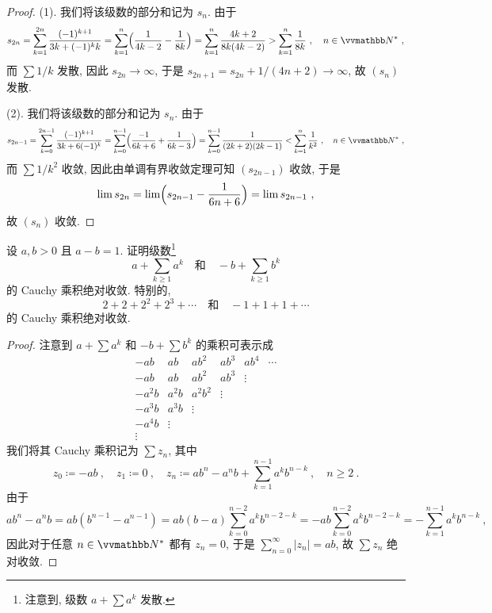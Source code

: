 \begin{proof}
    (1). 我们将该级数的部分和记为 \(s_n\). 由于
    \[
        s_{2 n} = \sum_{k = 1}^{2 n} \frac{(- 1)^{k + 1}}{3 k + (- 1)^k k} = \sum_{k = 1}^n \Bigl(\frac{1}{4 k - 2} - \frac{1}{8 k}\Bigr) = \sum_{k = 1}^n \frac{4 k + 2}{8 k (4 k - 2)} > \sum_{k = 1}^n \frac{1}{8 k}\ ,\quad n \in \N^\ast\ ,
    \]
    而 \(\sum 1 / k\) 发散, 因此 \(s_{2 n} \to \infty\), 于是 \(s_{2 n + 1} = s_{2 n} + 1 / (4 n + 2) \to \infty\), 故 \((s_n)\) 发散.

    (2). 我们将该级数的部分和记为 \(s_n\). 由于
    \[
        s_{2 n - 1} = \sum_{k = 0}^{2 n - 1} \frac{(- 1)^{k + 1}}{3 k + 6 (- 1)^k} = \sum_{k = 0}^{n - 1} \Bigl(\frac{- 1}{6 k + 6} + \frac{1}{6 k - 3}\Bigr) = \sum_{k = 0}^{n - 1} \frac{1}{(2 k + 2) (2 k - 1)} < \sum_{k = 1}^n \frac{1}{k^2}\ ,\quad n \in \N^\ast\ ,
    \]
    而 \(\sum 1 / k^2\) 收敛, 因此由单调有界收敛定理可知 \((s_{2 n - 1})\) 收敛, 于是
    \[
        \lim s_{2 n} = \lim \Bigl(s_{2 n - 1} - \frac{1}{6 n + 6}\Bigr) = \lim s_{2 n - 1}\ ,
    \]
    故 \((s_n)\) 收敛.
\end{proof}

\begin{exercise}
    设 \(a, b > 0\) 且 \(a - b = 1\). 证明级数\footnote{注意到, 级数 \(a + \sum a^k\) 发散.}
    \[
        a + \sum_{k \geq 1} a^k\quad \text{和}\quad - b + \sum_{k \geq 1} b^k
    \]
    的 Cauchy 乘积绝对收敛. 特别的,
    \[
        2 + 2 + 2^2 + 2^3 + \cdots\quad \text{和}\quad - 1 + 1 + 1 + \cdots
    \]
    的 Cauchy 乘积绝对收敛.
\end{exercise}

\begin{proof}
    注意到 \(a + \sum a^k\) 和 \(- b + \sum b^k\) 的乘积可表示成
    \[
        \begin{matrix}
            - a b   & a b   & a b^2   & a b^3 & a b^4 & \cdots \\
            - a b   & a b   & a b^2   & a b^3 & \vdots \\
            - a^2 b & a^2 b & a^2 b^2 & \vdots \\
            - a^3 b & a^3 b & \vdots \\
            - a^4 b & \vdots \\
            \vdots
        \end{matrix}
    \]
    我们将其 Cauchy 乘积记为 \(\sum z_n\), 其中
    \[
        z_0 \coloneqq - a b\ ,\quad z_1 \coloneqq 0\ ,\quad z_n \coloneqq a b^n - a^n b + \sum_{k = 1}^{n - 1} a^k b^{n - k}\ ,\quad n \geq 2\ .
    \]
    由于
    \[
        a b^n - a^n b = a b (b^{n - 1} - a^{n - 1}) = a b (b - a) \sum_{k = 0}^{n - 2} a^k b^{n - 2 - k} = - a b \sum_{k = 0}^{n - 2} a^k b^{n - 2 - k} = - \sum_{k = 1}^{n - 1} a^k b^{n - k}\ ,
    \]
    因此对于任意 \(n \in \N^\ast\) 都有 \(z_n = 0\), 于是 \(\sum_{n = 0}^\infty |z_n| = a b\), 故 \(\sum z_n\) 绝对收敛.
\end{proof}

